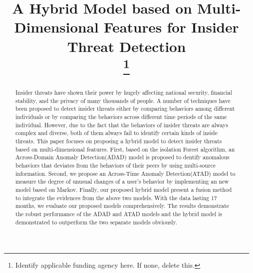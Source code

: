 \documentclass[conference]{IEEEtran}
\begin{document}
\title{A Hybrid Model based on Multi-Dimensional Features for Insider Threat Detection\\
\thanks{Identify applicable funding agency here. If none, delete this.}
}

\author{

}

\maketitle

\begin{abstract}
Insider threats have shown their power by hugely affecting national security, financial stability, and the privacy of many thousands of people.
A number of techniques have been proposed to detect insider threats either by comparing behaviors among different individuals or by comparing the behaviors across different time periods of the same individual. However, due to the  fact that the behaviors of insider threats are always complex and diverse, both of them always fail to identify certain kinds of inside threats.
This paper focuses on proposing a hybrid model to detect insider threats  based on multi-dimensional features.
First, based on the isolation Forest algorithm,  
an Across-Domain Anomaly Detection(ADAD) model is proposed to dentify anomalous behaviors that deviates from the behaviors of their peers by using multi-source information. Second, we propose an Across-Time Anomaly Detection(ATAD) model to measure the degree of unusual changes of a user's behavior  by implementing an new model based on Markov. Finally, our proposed hybrid model present a fusion
method to integrate the evidences from the above two models. With the data lasting 17 months, we evaluate our proposed models comprehensively. The results demonstrate the robust performance of the ADAD and ATAD models and the hybrid model is demonstrated to outperform the two separate models obviously.


\end{abstract}
\end{document}
